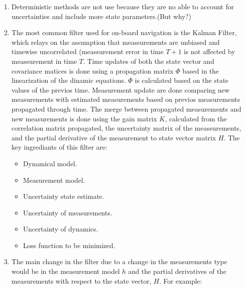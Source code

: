 \documentclass[a4paper]{article}
\begin{document}
\begin{enumerate}[label=\emph{\alph*)}]
  \item Deterministic methods are not use because they are no able to account for uncertainties and include more state parameters.(But why?)

  \item The most common filter used for on-board navigation is the Kalman Filter, which relays on the assumption that meassurements are unbiased and timewise uncorrelated (meassurement error in time $T+1$ is not affected by meassurement in time $T$. Time updates of both the state vector and covariance matices is done using a propagation matrix $\Phi$ based in the linearization of the dinamic equations. $\Phi$ is calculated based on the state values of the previos time. Measurement update are done comparing new measurements with estimated measurements based on previos measurements propagated through time. The merge between propagated measurements and new measurements is done using the gain matrix $K$, calculated from the correlation matrix propagated, the uncertainty matrix of the meassurements, and the partial derivative of the measurement to state vector matrix $H$. The key ingrediants of this filter are:
    \begin{itemize}
      \item Dynamical model.
      \item Measurement model.
      \item Uncertainty state estimate.
      \item Uncertainty of measurements.
      \item Uncertainty of dynamics.
      \item Loss function to be minimized.
    \end{itemize}

  \item The main change in the filter due to a change in the measurements type would be in the measurement model $h$ and the partial derivatives of the measurements with respect to the state vector, $H$. For example:
    

\end{enumerate}
\end{document}
